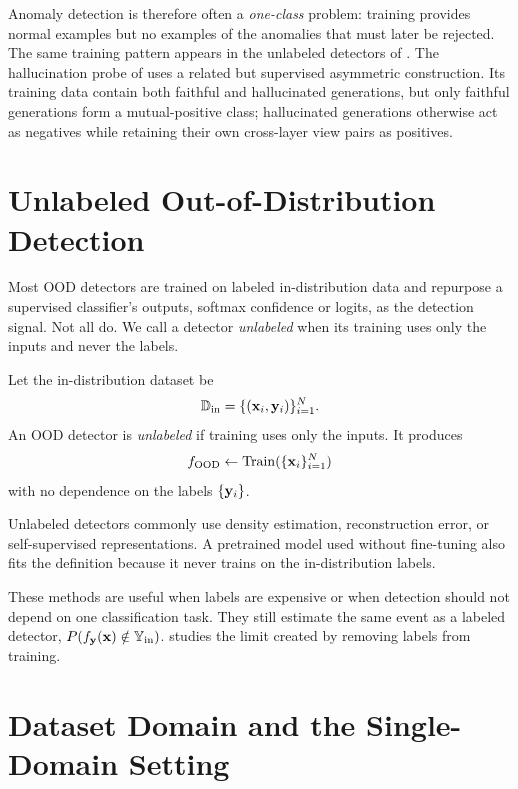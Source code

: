 Anomaly detection is therefore often a \emph{one-class} problem: training provides
normal examples but no examples of the anomalies that must later be rejected. The
same training pattern appears in the unlabeled detectors of
. The hallucination probe of
 uses a related but supervised asymmetric
construction. Its training data contain both faithful and hallucinated
generations, but only faithful generations form a mutual-positive class;
hallucinated generations otherwise act as negatives while retaining their own
cross-layer view pairs as positives.

\section{Unlabeled Out-of-Distribution Detection}
\label{sec:bg:unlabeled}

Most OOD detectors are trained on labeled in-distribution data and repurpose a
supervised classifier's outputs, softmax confidence or logits, as the detection
signal. Not all do. We call a detector \emph{unlabeled} when its training uses only
the inputs and never the labels.

\begin{definition}
Let the in-distribution dataset be
\[
  {\mathbb{D}}_{\text{in}}=\{({\mathbf{x}}_i,{\mathbf{y}}_i)\}_{i=1}^{N}.
\]
An OOD detector is \emph{unlabeled} if training uses only the inputs. It produces
\[
  f_{\text{OOD}}\gets\mathrm{Train}(\{{\mathbf{x}}_i\}_{i=1}^{N})
\]
with no dependence on the labels $\{{\mathbf{y}}_i\}$.
\label{def:bg:unlabeled}
\end{definition}

Unlabeled detectors commonly use density estimation, reconstruction error, or
self-supervised representations. A pretrained model used without fine-tuning also
fits the definition because it never trains on the in-distribution labels.

These methods are useful when labels are expensive or when detection should not
depend on one classification task. They still estimate the same event as a labeled
detector, $P(f_{{\mathbf{y}}}({\mathbf{x}}) \notin {\mathbb{Y}}_{\text{in}})$. 
studies the limit created by removing labels from training.

\section{Dataset Domain and the Single-Domain Setting}
\label{sec:bg:domain}

